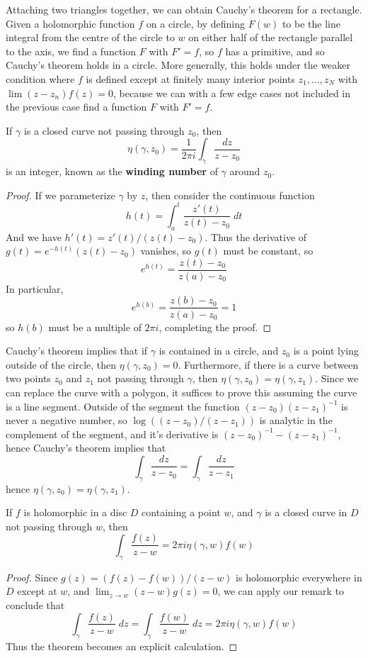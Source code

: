 Attaching two triangles together, we can obtain Cauchy's theorem for a rectangle. Given a holomorphic function $f$ on a circle, by defining $F(w)$ to be the line integral from the centre of the circle to $w$ on either half of the rectangle parallel to the axis, we find a function $F$ with $F' = f$, so $f$ has a primitive, and so Cauchy's theorem holds in a circle. More generally, this holds under the weaker condition where $f$ is defined except at finitely many interior points $z_1, \dots, z_N$ with $\lim (z - z_n) f(z) = 0$, because we can with a few edge cases not included in the previous case find a function $F$ with $F' = f$.

\begin{lemma}
    If $\gamma$ is a closed curve not passing through $z_0$, then
    \[ \eta(\gamma,z_0) = \frac{1}{2 \pi i} \int_\gamma \frac{dz}{z - z_0} \]
    is an integer, known as the {\bf winding number} of $\gamma$ around $z_0$.
\end{lemma}
\begin{proof}
    If we parameterize $\gamma$ by $z$, then consider the continuous function
    \[ h(t) = \int_a^t \frac{z'(t)}{z(t) - z_0}\; dt \]
    And we have $h'(t) = z'(t)/(z(t) - z_0)$. Thus the derivative of $g(t) = e^{-h(t)}(z(t) - z_0)$ vanishes, so $g(t)$ must be constant, so
    \[ e^{h(t)} = \frac{z(t) - z_0}{z(a) - z_0} \]
    In particular,
    \[ e^{h(b)} = \frac{z(b) - z_0}{z(a) - z_0} = 1 \]
    so $h(b)$ must be a multiple of $2 \pi i$, completing the proof.
\end{proof}

Cauchy's theorem implies that if $\gamma$ is contained in a circle, and $z_0$ is a point lying outside of the circle, then $\eta(\gamma,z_0) = 0$. Furthermore, if there is a curve between two points $z_0$ and $z_1$ not passing through $\gamma$, then $\eta(\gamma,z_0) = \eta(\gamma,z_1)$. Since we can replace the curve with a polygon, it suffices to prove this assuming the curve is a line segment. Outside of the segment the function $(z - z_0)(z - z_1)^{-1}$ is never a negative number, so $\log((z-z_0)/(z-z_1))$ is analytic in the complement of the segment, and it's derivative is $(z - z_0)^{-1} - (z - z_1)^{-1}$, hence Cauchy's theorem implies that
%
\[ \int_\gamma \frac{dz}{z - z_0} = \int_\gamma \frac{dz}{z - z_1} \]
%
hence $\eta(\gamma,z_0) = \eta(\gamma,z_1)$.

\begin{theorem}
    If $f$ is holomorphic in a disc $D$ containing a point $w$, and $\gamma$ is a closed curve in $D$ not passing through $w$, then
    \[ \int_\gamma \frac{f(z)}{z - w} = 2 \pi i \eta(\gamma,w) f(w) \]
\end{theorem}
\begin{proof}
    Since $g(z) = (f(z) - f(w))/(z-w)$ is holomorphic everywhere in $D$ except at $w$, and $\lim_{z \to w} (z - w) g(z) = 0$, we can apply our remark to conclude that
    \[ \int_\gamma \frac{f(z)}{z - w}\; dz = \int_\gamma \frac{f(w)}{z - w}\; dz = 2 \pi i \eta(\gamma,w) f(w) \]
    Thus the theorem becomes an explicit calculation.
\end{proof}


